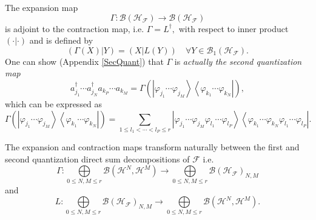 \documentclass[aps,preprint,amsfonts,amssymb,showpacs,showkeys]{revtex4}%
\begin{document}
The expansion map
\begin{equation}
\Gamma:\mathcal{B}\left(  \mathcal{H}_{\mathcal{F}}\right)  \rightarrow
\mathcal{B}\left(  \mathcal{H}_{\mathcal{F}}\right)
\end{equation}
is adjoint to the contraction map, i.e. $\Gamma=L^{\dagger},$ with respect to
inner product $\left(  \cdot\left\vert \cdot\right.  \right)  $ and is defined
by
\begin{equation}
\left(  \Gamma\left(  X\right)  \left\vert Y\right.  \right)  =\left(
X\left\vert L\left(  Y\right)  \right.  \right)  \quad\forall Y\in
\mathcal{B}_{1}\left(  \mathcal{H}_{\mathcal{F}}\right)  .
\end{equation}
One can show (Appendix \ref{SecQuant}) that $\Gamma$ is \emph{actually the
second quantization map}
\begin{equation}
a_{j_{1}}^{\dagger}\cdots a_{j_{N}}^{\dagger}a_{k_{P}}\cdots a_{k_{M}}%
=\Gamma\left(  \left\vert \varphi_{j_{1}}\cdots\varphi_{j_{M}}\right\rangle
\left\langle \varphi_{k_{1}}\cdots\varphi_{k_{N}}\right\vert \right)  ,
\end{equation}
which can be expressed as
\begin{equation}
\Gamma\left(  \left\vert \varphi_{j_{1}}\cdots\varphi_{j_{M}}\right\rangle
\left\langle \varphi_{k_{1}}\cdots\varphi_{k_{N}}\right\vert \right)
=\sum_{1\leq l_{1}<\cdots<l_{P}\leq r}\left\vert \varphi_{j_{1}}\cdots
\varphi_{j_{M}}\varphi_{l_{1}}\cdots\varphi_{l_{P}}\right\rangle \left\langle
\varphi_{k_{1}}\cdots\varphi_{k_{N}}\varphi_{l_{1}}\cdots\varphi_{l_{P}%
}\right\vert .
\end{equation}


The expansion and contraction maps transform naturally between the first and
second quantization direct sum decompositions of $\mathcal{F}$ i.e.
\begin{equation}
\Gamma:%
{\displaystyle\bigoplus\limits_{0\leq N,M\leq r}}
\mathcal{B}\left(  \mathcal{H}^{N},\mathcal{H}^{M}\right)  \rightarrow%
{\displaystyle\bigoplus\limits_{0\leq N,M\leq r}}
\mathcal{B}\left(  \mathcal{H}_{\mathcal{F}}\right)  _{N,M}%
\end{equation}
and
\begin{equation}
L:%
{\displaystyle\bigoplus\limits_{0\leq N,M\leq r}}
\mathcal{B}\left(  \mathcal{H}_{\mathcal{F}}\right)  _{N,M}\rightarrow%
{\displaystyle\bigoplus\limits_{0\leq N,M\leq r}}
\mathcal{B}\left(  \mathcal{H}^{N},\mathcal{H}^{M}\right)  .
\end{equation}
\end{document}
